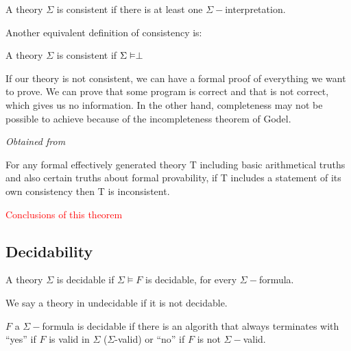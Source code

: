 \begin{defn}[Consistent]

	A theory $\Sigma$ is consistent if there is at least one $\Sigma-$interpretation.

	Another equivalent definition of consistency is:

	A theory $\Sigma$ is consistent if $\Sigma \vDash \perp$
\end{defn}

If our theory is not consistent, we can have a formal proof of everything we want to prove.
We can prove that some program is correct and that is not correct, which gives us no information.
In the other hand, completeness may not be possible to achieve because of the incompleteness theorem of Godel.

\begin{itheorem}

\textit{Obtained from }

For any formal effectively generated theory T including basic arithmetical truths and also certain truths about formal provability, if T includes a statement of its own consistency then T is inconsistent.

\end{itheorem}

\textcolor{red}{Conclusions of this theorem}



\subsection{Decidability}

\begin{defn}

A theory $\Sigma$ is decidable if $\Sigma \vDash F$ is decidable, for every $\Sigma-$formula.

We say a theory in undecidable if it is not decidable.
\end{defn}

\begin{defn}

$F$ a $\Sigma-$formula is decidable if there is an algorith that always terminates with ``yes'' if $F$ is valid in $\Sigma$ ($\Sigma$-valid) or ``no'' if $F$ is not $\Sigma-$valid.
\end{defn}

